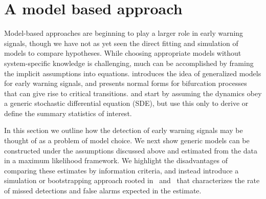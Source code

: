 \documentclass[authoryear,review,11pt]{elsarticle}
\begin{document}
\section{A model based approach}
Model-based approaches are beginning to play a larger role in early warning signals, 
though we have not as yet seen the direct fitting and simulation of models to compare hypotheses.  
While choosing appropriate models without system-specific knowledge is challenging, 
much can be accomplished by framing the implicit assumptions into equations.
\citet{Lade2011} introduces the idea of generalized models for early warning signals, and 
\citet{Kuehn2011} presents normal forms for bifurcation processes that can give rise to critical transitions.  
\citet{Carpenter2011e} and \citet{Dakos2011a} start by assuming the dynamics obey a generic
stochastic differential equation (SDE), but use this only to derive or define the summary statistics of interest.  

In this section we outline how the detection of early warning signals may be thought of
as a problem of model choice.
We next show generic models can be constructed under the assumptions discussed above
and estimated from the data in a maximum likelihood framework.
We highlight the disadvantages of comparing these estimates by information criteria, 
and instead introduce a simulation or bootstrapping approach rooted in~\citet{Cox1961} and~\citet{McLachlan1987} that
characterizes the rate of missed detections and false alarms expected in the estimate. 
\end{document}
